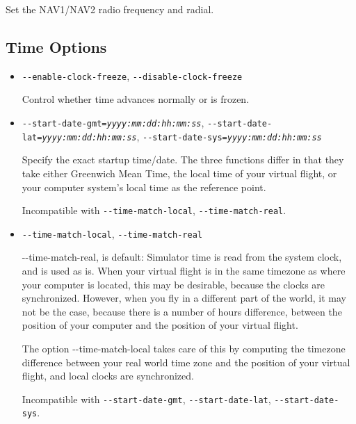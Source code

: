 {\begin{itemize}
Set the NAV1/NAV2 radio frequency and radial.

\end{itemize}

\subsection{Time Options}
\begin{itemize}

\item{\texttt{-$ $-enable-clock-freeze}, \texttt{-$ $-disable-clock-freeze}}

Control whether time advances normally or is frozen.

\item{\texttt{-$ $-start-date-gmt={\it yyyy:mm:dd:hh:mm:ss}},
\texttt{-$ $-start-date-lat={\it yyyy:mm:dd:hh:mm:ss}}, \texttt{-$ $-start-date-sys={\it yyyy:mm:dd:hh:mm:ss}}}

Specify the exact startup time/date. The three functions differ in that they
take either Greenwich Mean Time, the local time of your virtual flight, or
your computer system's local time as the reference point.

Incompatible with \texttt{-$ $-time-match-local}, \texttt{-$ $-time-match-real}.

\item{\texttt{-$ $-time-match-local}, \texttt{-$ $-time-match-real}}

{-$ $-time-match-real}, is default: Simulator time is read from the system clock, and
is used as is. When your virtual flight is in the same timezone as where your computer
is located, this may be desirable, because the clocks are synchronized. However,
when you fly in a different part of the world, it may not be the case, because there
is a number of hours difference, between the position of your computer and the position of your
virtual flight.

The option {-$ $-time-match-local} takes care of this by computing the timezone
difference between your real world time zone and the position of your virtual
flight, and local clocks are synchronized.

Incompatible with \texttt{-$ $-start-date-gmt}, \texttt{-$ $-start-date-lat}, \texttt{-$ $-start-date-sys}.


\end{itemize}}
